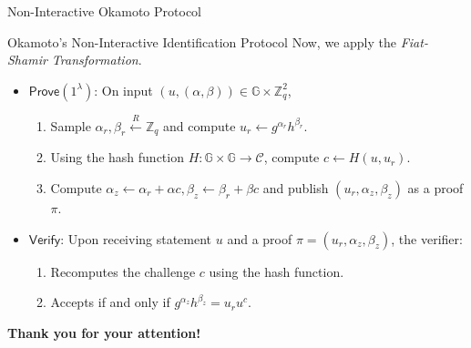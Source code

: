 \documentclass[xcolor={usenames,dvipsnames}]{beamer}
\begin{document}
    \begin{frame}{Non-Interactive Okamoto Protocol}
        \begin{block}{Okamoto's Non-Interactive Identification Protocol}
            \textcolor{green!60!black}{Now, we apply the \textit{Fiat-Shamir Transformation}.}
            \begin{itemize}
                \item \textcolor{green!60!black}{$\mathsf{Prove}(1^{\lambda})$: On input $(u,(\alpha,\beta)) \in \mathbb{G} \times \mathbb{Z}_q^2$, }
                \begin{enumerate}
                    \item \textcolor{green!60!black}{Sample $\alpha_r,\beta_r \xleftarrow{R} \mathbb{Z}_q$ and compute $u_r \gets g^{\alpha_r}h^{\beta_r}$.}
                    \item \textcolor{green!60!black}{Using the hash function $H: \mathbb{G} \times \mathbb{G} \to \mathcal{C}$, compute $c \gets H(u,u_r)$.}
                    \item \textcolor{green!60!black}{Compute $\alpha_z \gets \alpha_r + \alpha c, \beta_z \gets \beta_r + \beta c$ and publish $(u_r,\alpha_z,\beta_z)$ as a proof $\pi$.}
                \end{enumerate}
                \item \textcolor{green!60!black}{$\mathsf{Verify}$: Upon receiving statement $u$ and a proof $\pi=(u_r,\alpha_z,\beta_z)$, the verifier:}
                \begin{enumerate}
                    \item \textcolor{green!60!black}{Recomputes the challenge $c$ using the hash function.}
                    \item \textcolor{green!60!black}{Accepts if and only if $g^{\alpha_z}h^{\beta_z} = u_ru^c$.}
                \end{enumerate}
            \end{itemize}
        \end{block}
    \end{frame}

	\begin{frame}{}
      \centering \Large
      \textbf{Thank you for your attention!}
    \end{frame}
\end{document}
